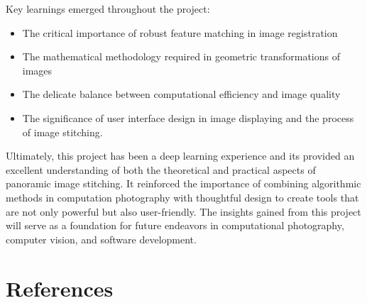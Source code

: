 \documentclass[12pt, letterpaper, ]{article}
\begin{document}
Key learnings emerged throughout the project:
\begin{itemize}
\item The critical importance of robust feature matching in image registration
\item The mathematical methodology required in geometric transformations of images
\item The delicate balance between computational efficiency and image quality
\item The significance of user interface design in image displaying and the process of image stitching.
\end{itemize}

Ultimately, this project has been a deep learning experience and its provided an excellent understanding of both the theoretical and practical aspects of panoramic image stitching. It reinforced the importance of combining algorithmic methods in computation photography with thoughtful design to create tools that are not only powerful but also user-friendly. The insights gained from this project will serve as a foundation for future endeavors in computational photography, computer vision, and software development.





\section{References}
\end{document}
